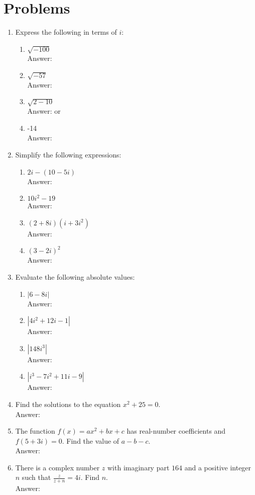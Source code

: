 \documentclass[12pt]{extarticle}
\begin{document}
\section{Problems}
\begin{enumerate}
    \itemsep 2.0em
    \item {Express the following in terms of $i$:
        \begin{enumerate}
            \itemsep 1.0em
            \item {$\sqrt{-100}$ \\Answer: }
            \item {$\sqrt{-57}$ \\Answer: }
            \item {$\sqrt{2-10}$ \\Answer:  or }
            \item {-14 \\Answer: }
        \end{enumerate}
    }
    \item {Simplify the following expressions:
        \begin{enumerate}
            \itemsep 1.0em
            \item {$2i - (10 - 5i)$ \\Answer: }
            \item {$10i^2 - 19$ \\Answer: }
            \item {$(2+8i)(i+3i^2)$ \\Answer: }
            \item {$(3-2i)^2$ \\Answer: }
        \end{enumerate}
    }
    \item {Evaluate the following absolute values:
        \begin{enumerate}
            \itemsep 1.0em
            \item {$|6-8i|$ \\Answer: }
            \item {$|4i^2+12i-1|$ \\Answer: }
            \item {$|148i^3|$ \\Answer: }
            \item {$|i^3-7i^2+11i-9|$ \\Answer: }
        \end{enumerate}
    }
    \item {Find the solutions to the equation $x^2 + 25 = 0$. \\Answer: }
    \item {The function $f(x) = ax^2+bx+c$ has real-number coefficients and $f(5+3i) = 0$. Find the value of $a-b-c$. \\Answer: }
    \item {There is a complex number $z$ with imaginary part $164$ and a positive integer $n$ such that $\frac{z}{z + n} = 4i$. Find $n$. \\Answer: }
\end{enumerate}
\end{document}
